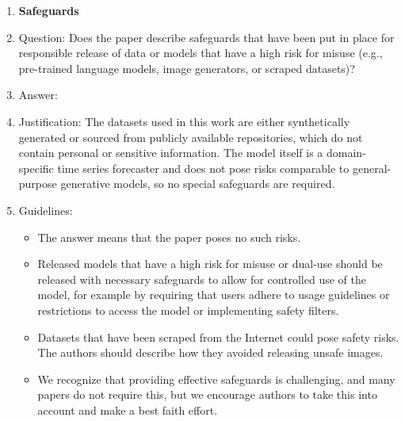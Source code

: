 \documentclass{article}
\begin{document}
\begin{enumerate}
\item {\bf Safeguards}
    \item[] Question: Does the paper describe safeguards that have been put in place for responsible release of data or models that have a high risk for misuse (e.g., pre-trained language models, image generators, or scraped datasets)?
    \item[] Answer: \answerNA{} %
    \item[] Justification: The datasets used in this work are either synthetically generated or sourced from publicly available repositories, which do not contain personal or sensitive information. The model itself is a domain-specific time series forecaster and does not pose risks comparable to general-purpose generative models, so no special safeguards are required.
    \item[] Guidelines:
    \begin{itemize}
        \item The answer \answerNA{} means that the paper poses no such risks.
        \item Released models that have a high risk for misuse or dual-use should be released with necessary safeguards to allow for controlled use of the model, for example by requiring that users adhere to usage guidelines or restrictions to access the model or implementing safety filters. 
        \item Datasets that have been scraped from the Internet could pose safety risks. The authors should describe how they avoided releasing unsafe images.
        \item We recognize that providing effective safeguards is challenging, and many papers do not require this, but we encourage authors to take this into account and make a best faith effort.
    \end{itemize}


\end{enumerate}
\end{document}
